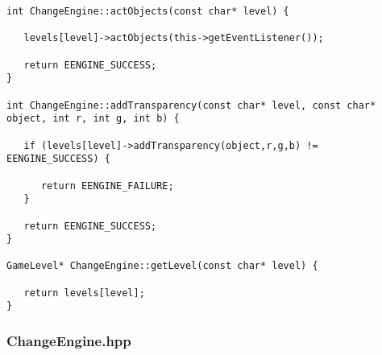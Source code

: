 \documentclass[12pt]{article}
\begin{document}
\begin{lstlisting}[breaklines]
int ChangeEngine::actObjects(const char* level) {

   levels[level]->actObjects(this->getEventListener());
   
   return EENGINE_SUCCESS;
}

int ChangeEngine::addTransparency(const char* level, const char* object, int r, int g, int b) {
   
   if (levels[level]->addTransparency(object,r,g,b) != EENGINE_SUCCESS) {
      
      return EENGINE_FAILURE;
   }
   
   return EENGINE_SUCCESS;
}

GameLevel* ChangeEngine::getLevel(const char* level) {
   
   return levels[level];
}
\end{lstlisting}
\subsubsection{ChangeEngine.hpp}
\end{document}
